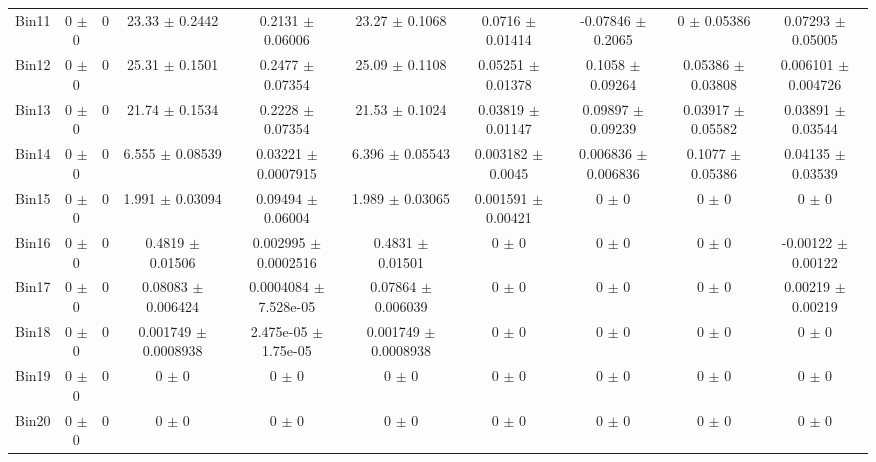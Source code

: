 \begin{tabular}{@{\extracolsep{4pt}}lccccccccc@{}}
     Bin11 & 0 $\pm$ 0 & 0 & 23.33 $\pm$ 0.2442 & 0.2131 $\pm$ 0.06006 & 23.27 $\pm$ 0.1068 & 0.0716 $\pm$ 0.01414 & -0.07846 $\pm$ 0.2065 & 0 $\pm$ 0.05386 & 0.07293 $\pm$ 0.05005 \\ 
     Bin12 & 0 $\pm$ 0 & 0 & 25.31 $\pm$ 0.1501 & 0.2477 $\pm$ 0.07354 & 25.09 $\pm$ 0.1108 & 0.05251 $\pm$ 0.01378 & 0.1058 $\pm$ 0.09264 & 0.05386 $\pm$ 0.03808 & 0.006101 $\pm$ 0.004726 \\ 
     Bin13 & 0 $\pm$ 0 & 0 & 21.74 $\pm$ 0.1534 & 0.2228 $\pm$ 0.07354 & 21.53 $\pm$ 0.1024 & 0.03819 $\pm$ 0.01147 & 0.09897 $\pm$ 0.09239 & 0.03917 $\pm$ 0.05582 & 0.03891 $\pm$ 0.03544 \\ 
     Bin14 & 0 $\pm$ 0 & 0 & 6.555 $\pm$ 0.08539 & 0.03221 $\pm$ 0.0007915 & 6.396 $\pm$ 0.05543 & 0.003182 $\pm$ 0.0045 & 0.006836 $\pm$ 0.006836 & 0.1077 $\pm$ 0.05386 & 0.04135 $\pm$ 0.03539 \\ 
     Bin15 & 0 $\pm$ 0 & 0 & 1.991 $\pm$ 0.03094 & 0.09494 $\pm$ 0.06004 & 1.989 $\pm$ 0.03065 & 0.001591 $\pm$ 0.00421 & 0 $\pm$ 0 & 0 $\pm$ 0 & 0 $\pm$ 0 \\ 
     Bin16 & 0 $\pm$ 0 & 0 & 0.4819 $\pm$ 0.01506 & 0.002995 $\pm$ 0.0002516 & 0.4831 $\pm$ 0.01501 & 0 $\pm$ 0 & 0 $\pm$ 0 & 0 $\pm$ 0 & -0.00122 $\pm$ 0.00122 \\ 
     Bin17 & 0 $\pm$ 0 & 0 & 0.08083 $\pm$ 0.006424 & 0.0004084 $\pm$ 7.528e-05 & 0.07864 $\pm$ 0.006039 & 0 $\pm$ 0 & 0 $\pm$ 0 & 0 $\pm$ 0 & 0.00219 $\pm$ 0.00219 \\ 
     Bin18 & 0 $\pm$ 0 & 0 & 0.001749 $\pm$ 0.0008938 & 2.475e-05 $\pm$ 1.75e-05 & 0.001749 $\pm$ 0.0008938 & 0 $\pm$ 0 & 0 $\pm$ 0 & 0 $\pm$ 0 & 0 $\pm$ 0 \\ 
     Bin19 & 0 $\pm$ 0 & 0 & 0 $\pm$ 0 & 0 $\pm$ 0 & 0 $\pm$ 0 & 0 $\pm$ 0 & 0 $\pm$ 0 & 0 $\pm$ 0 & 0 $\pm$ 0 \\ 
     Bin20 & 0 $\pm$ 0 & 0 & 0 $\pm$ 0 & 0 $\pm$ 0 & 0 $\pm$ 0 & 0 $\pm$ 0 & 0 $\pm$ 0 & 0 $\pm$ 0 & 0 $\pm$ 0 \\ 
\hline\hline
  \end{tabular}
